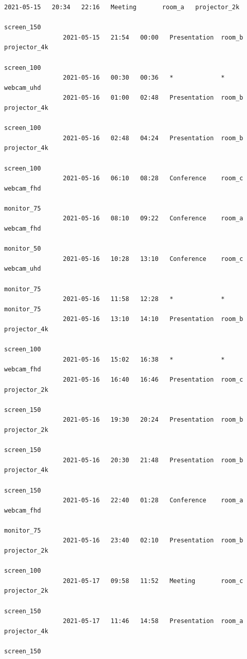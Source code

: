 \documentclass{article}
\begin{document}
\begin{Verbatim}[gobble=8]
                2021-05-15   20:34   22:16   Meeting       room_a   projector_2k
                                                                    screen_150
                2021-05-15   21:54   00:00   Presentation  room_b   projector_4k
                                                                    screen_100
                2021-05-16   00:30   00:36   *             *        webcam_uhd
                2021-05-16   01:00   02:48   Presentation  room_b   projector_4k
                                                                    screen_100
                2021-05-16   02:48   04:24   Presentation  room_b   projector_4k
                                                                    screen_100
                2021-05-16   06:10   08:28   Conference    room_c   webcam_fhd
                                                                    monitor_75
                2021-05-16   08:10   09:22   Conference    room_a   webcam_fhd
                                                                    monitor_50
                2021-05-16   10:28   13:10   Conference    room_c   webcam_uhd
                                                                    monitor_75
                2021-05-16   11:58   12:28   *             *        monitor_75
                2021-05-16   13:10   14:10   Presentation  room_b   projector_4k
                                                                    screen_100
                2021-05-16   15:02   16:38   *             *        webcam_fhd
                2021-05-16   16:40   16:46   Presentation  room_c   projector_2k
                                                                    screen_150
                2021-05-16   19:30   20:24   Presentation  room_b   projector_2k
                                                                    screen_150
                2021-05-16   20:30   21:48   Presentation  room_b   projector_4k
                                                                    screen_150
                2021-05-16   22:40   01:28   Conference    room_a   webcam_fhd
                                                                    monitor_75
                2021-05-16   23:40   02:10   Presentation  room_b   projector_2k
                                                                    screen_100
                2021-05-17   09:58   11:52   Meeting       room_c   projector_2k
                                                                    screen_150
                2021-05-17   11:46   14:58   Presentation  room_a   projector_4k
                                                                    screen_150

\end{Verbatim}
\end{document}
